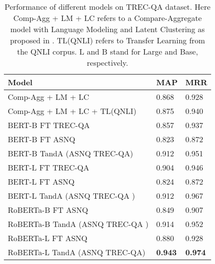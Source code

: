 \documentclass[letterpaper]{article} \usepackage{aaai20}  \usepackage{times}  \usepackage{helvet} \usepackage{courier}  \usepackage[hyphens]{url}  \usepackage{graphicx} \urlstyle{rm} \def\UrlFont{\rm}  \usepackage{graphicx}  \usepackage{todonotes}
\newcommand{\TANDA}{T{\sc and}A}
\begin{document}
\begin{table}[t]
\small
\center
\begin{tabular}{|l|l|l|}
\hline
\textbf{Model}                                                                         & \textbf{MAP}   & \textbf{MRR}   \\ \hline
Comp-Agg + LM + LC                                                            & 0.868 & 0.928 \\ \hline
Comp-Agg + LM + LC + TL(QNLI)                                                 & 0.875 & 0.940 \\ \hline\hline
BERT-B	 FT TREC-QA                                                           & 0.857 & 0.937 \\ \hline
BERT-B	 FT ASNQ                                                             & 0.823 & 0.872 \\ \hline
BERT-B	 {\TANDA} (ASNQ   TREC-QA)                                                  & 0.912 & 0.951 \\ \hline\hline
BERT-L	 FT TREC-QA                                                          & 0.904 & 0.946 \\ \hline
BERT-L	 FT ASNQ                                                            & 0.824 & 0.872 \\ \hline
BERT-L	  {\TANDA} (ASNQ   TREC-QA )                                                & 0.912 & 0.967 \\ \hline\hline
RoBERTa-B	 FT ASNQ                                                             & 0.849 & 0.907 \\ \hline
RoBERTa-B	  {\TANDA} (ASNQ  TREC-QA )                                                 & 0.914 & 0.952 \\ \hline
RoBERTa-L	 FT ASNQ                                                            & 0.880 & 0.928 \\ \hline
RoBERTa-L	  {\TANDA} (ASNQ   TREC-QA)                                                & \textbf{0.943} & \textbf{0.974} \\ \hline
\end{tabular}\caption{Performance of different models on TREC-QA dataset. 
Here Comp-Agg + LM + LC refers to a Compare-Aggregate model with Language Modeling and Latent Clustering as proposed in \cite{DBLP:journals/corr/abs-1905-12897}. 
TL(QNLI) refers to Transfer Learning from the QNLI corpus. L and B stand for Large and Base, respectively.}
\label{Table:TrecQA_results}
\vspace{-1.0em}
\end{table}
\end{document}
